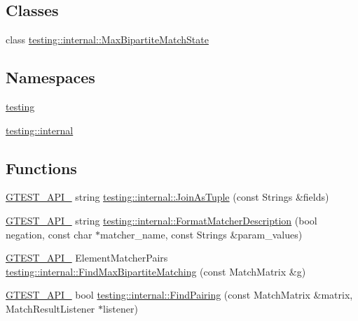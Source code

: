 \subsection*{Classes}
\begin{DoxyCompactItemize}
\item 
class \hyperlink{classtesting_1_1internal_1_1_max_bipartite_match_state}{testing\+::internal\+::\+Max\+Bipartite\+Match\+State}
\end{DoxyCompactItemize}
\subsection*{Namespaces}
\begin{DoxyCompactItemize}
\item 
 \hyperlink{namespacetesting}{testing}
\item 
 \hyperlink{namespacetesting_1_1internal}{testing\+::internal}
\end{DoxyCompactItemize}
\subsection*{Functions}
\begin{DoxyCompactItemize}
\item 
\hyperlink{gtest-port_8h_aa73be6f0ba4a7456180a94904ce17790}{G\+T\+E\+S\+T\+\_\+\+A\+P\+I\+\_\+} string \hyperlink{namespacetesting_1_1internal_a61d60981533cb0875bad9025e0d98b74}{testing\+::internal\+::\+Join\+As\+Tuple} (const Strings \&fields)
\item 
\hyperlink{gtest-port_8h_aa73be6f0ba4a7456180a94904ce17790}{G\+T\+E\+S\+T\+\_\+\+A\+P\+I\+\_\+} string \hyperlink{namespacetesting_1_1internal_a593b52fcbb46a765a31850661b1960f4}{testing\+::internal\+::\+Format\+Matcher\+Description} (bool negation, const char $\ast$matcher\+\_\+name, const Strings \&param\+\_\+values)
\item 
\hyperlink{gtest-port_8h_aa73be6f0ba4a7456180a94904ce17790}{G\+T\+E\+S\+T\+\_\+\+A\+P\+I\+\_\+} Element\+Matcher\+Pairs \hyperlink{namespacetesting_1_1internal_ae30bd8357c179334b2b09b0d689efccc}{testing\+::internal\+::\+Find\+Max\+Bipartite\+Matching} (const Match\+Matrix \&g)
\item 
\hyperlink{gtest-port_8h_aa73be6f0ba4a7456180a94904ce17790}{G\+T\+E\+S\+T\+\_\+\+A\+P\+I\+\_\+} bool \hyperlink{namespacetesting_1_1internal_af2bd2e350b56422a3d9d3b986ac1df0e}{testing\+::internal\+::\+Find\+Pairing} (const Match\+Matrix \&matrix, Match\+Result\+Listener $\ast$listener)
\end{DoxyCompactItemize}
